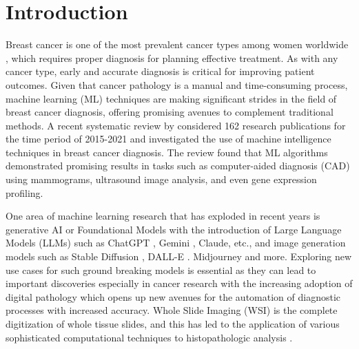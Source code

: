 

\chapter{Introduction}

\ifpdf
    \graphicspath{{1_introduction/figures/PNG/}{1_introduction/figures/PDF/}{1_introduction/figures/}}
\else
    \graphicspath{{1_introduction/figures/EPS/}{1_introduction/figures/}}
\fi


Breast cancer is one of the most prevalent cancer types among women worldwide \parencite{Sung2021GlobalCountries}, which requires proper diagnosis for planning effective treatment. As with any cancer type, early and accurate diagnosis is critical for improving patient outcomes. Given that cancer pathology is a manual and time-consuming process, machine learning (ML) techniques are making significant strides in the field of breast cancer diagnosis, offering promising avenues to complement traditional methods. A recent systematic review by \textcite{Nemade2022ATechniques} considered 162 research publications for the time period of 2015-2021 and investigated the use of machine intelligence techniques in breast cancer diagnosis. The review found that ML algorithms demonstrated promising results in tasks such as computer-aided diagnosis (CAD) using mammograms, ultrasound image analysis, and even gene expression profiling. 

One area of machine learning research that has exploded in recent years is generative AI or Foundational Models \parencite{Bommasani2021OnModels} with the introduction of Large Language Models (LLMs) such as ChatGPT \parencite{Brown2020LanguageLearners} \parencite{OpenAI2023GPT-4Report}, Gemini \parencite{GeminiTeam2023Gemini:Models}, Claude, etc., and image generation models such as Stable Diffusion \parencite{Rombach2021High-ResolutionModels}, DALL-E \parencite{Ramesh2021Zero-ShotGeneration}. Midjourney and more. Exploring new use cases for such ground breaking models is essential as they can lead to important discoveries especially in cancer research with the increasing adoption of digital pathology which opens up new avenues for the automation of diagnostic processes with increased accuracy. Whole Slide Imaging (WSI) is the complete digitization of whole tissue slides, and this has led to the application of various sophisticated computational techniques to histopathologic analysis \parencite{Aeffner2019IntroductionAssociation.} \parencite{Madabhushi2016ImageOpportunities.}.

